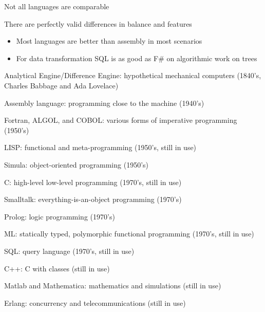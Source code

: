 \documentclass{beamer}
\begin{document}
\begin{slide}{
\item Not all languages are comparable
\item There are perfectly valid differences in balance and features
\begin{itemize}
\item Most languages are better than assembly in most scenarios
\item For data transformation SQL is as good as F\# on algorithmic work on trees
\end{itemize}
}\end{slide}

\begin{slide}{
\item Analytical Engine/Difference Engine: hypothetical mechanical computers (1840's, Charles Babbage and Ada Lovelace)
\item Assembly language: programming close to the machine (1940's)
\item Fortran, ALGOL, and COBOL: various forms of imperative programming (1950's)
\item LISP: functional and meta-programming (1950's, still in use)
\item Simula: object-oriented programming (1950's)
\item C: high-level low-level programming (1970's, still in use)
\item Smalltalk: everything-is-an-object programming (1970's)
}\end{slide}

\begin{slide}{
\item Prolog: logic programming (1970's)
\item ML: statically typed, polymorphic functional programming (1970's, still in use)
\item SQL: query language (1970's, still in use)
}\end{slide}

\begin{slide}{
\item C++: C with classes (still in use)
\item Matlab and Mathematica: mathematics and simulations (still in use)
\item Erlang: concurrency and telecommunications (still in use)
}\end{slide}
\end{document}
